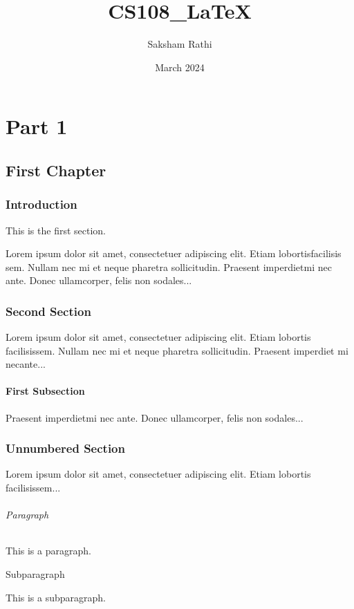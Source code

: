 \documentclass{book}
\title{CS108\_LaTeX}
\author{Saksham Rathi}
\date{March 2024}
\begin{document}
\maketitle

\part{Part 1}
\chapter{First Chapter}

\section{Introduction}

This is the first section.

Lorem  ipsum  dolor  sit  amet,  consectetuer  adipiscing  
elit. Etiam  lobortisfacilisis sem.  Nullam nec mi et 
neque pharetra sollicitudin.  Praesent imperdietmi nec ante. 
Donec ullamcorper, felis non sodales...

\section{Second Section}

Lorem ipsum dolor sit amet, consectetuer adipiscing elit.  
Etiam lobortis facilisissem.  Nullam nec mi et neque pharetra 
sollicitudin.  Praesent imperdiet mi necante...

\subsection{First Subsection}
Praesent imperdietmi nec ante. Donec ullamcorper, felis non sodales...

\section*{Unnumbered Section}
Lorem ipsum dolor sit amet, consectetuer adipiscing elit.  
Etiam lobortis facilisissem...

\paragraph{Paragraph}

This is a paragraph.

\subparagraph{Subparagraph}

This is a subparagraph.
\end{document}
